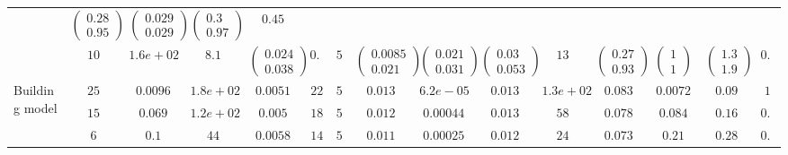 \begin{table*}[t]
\begin{tabular}{|p{1.5cm}|c|c|c|c|c|c|c|c|c|c|c|c|c|c|}
&$\begin{pmatrix}0.28  \\ 0.95 \end{pmatrix}$ &$\begin{pmatrix}0.029  \\ 0.029 \end{pmatrix}$ &$\begin{pmatrix}0.3  \\ 0.97 \end{pmatrix}$ & $0.45$  \\ 
\cline{2-15} 
& $10$ 
& $1.6e+02$ & $8.1$ 
&$\begin{pmatrix}0.024  \\ 0.038\end{pmatrix}$ & $0.55 $ & {$5$} 
&$\begin{pmatrix}0.0085  \\ 0.021 \end{pmatrix}$ &$\begin{pmatrix}0.021  \\ 0.031 \end{pmatrix}$ &$\begin{pmatrix}0.03  \\ 0.053 \end{pmatrix}$ & $13$ 
&$\begin{pmatrix}0.27  \\ 0.93 \end{pmatrix}$ &$\begin{pmatrix}1  \\ 1 \end{pmatrix}$ &$\begin{pmatrix}1.3  \\ 1.9 \end{pmatrix}$ & $0.45$  \\ 
\hline 

\multirow{3}{*}{\parbox{1.5cm}{Building model}} 
& $25$ 
& $0.0096$ & $1.8e+02$ 
&$0.0051$& $22$ &{$5$} 
&$0.013$ &$6.2e-05$ &$0.013$ &$1.3e+02$ 
&$0.083$ &$0.0072$ &$0.09$ &$1$ \\ 
\cline{2-15} 
& $15$ 
& $0.069$ & $1.2e+02$ 
&$0.005$& $18$ &{$5$} 
&$0.012$ &$0.00044$ &$0.013$ &$58$ 
&$0.078$ &$0.084$ &$0.16$ &$0.97$ \\ 
\cline{2-15} 
& $6$ 
& $0.1$ & $44$ 
&$0.0058$& $14$ &{$5$} 
&$0.011$ &$0.00025$ &$0.012$ &$24$ 
&$0.073$ &$0.21$ &$0.28$ &$0.98$ \\ 
\hline 


\end{tabular}
\end{table*}
